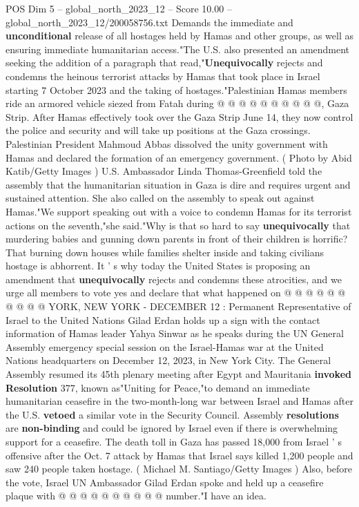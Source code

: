 \begin{textsample}{POS Dim 5 – global\_north\_2023\_12 – Score 10.00 – global\_north\_2023\_12/200058756.txt}
Demands the immediate and \textbf{unconditional} release of all hostages held by Hamas and other groups, as well as ensuring immediate humanitarian access."The U.S. also presented an amendment seeking the addition of a paragraph that read,"\textbf{Unequivocally} rejects and condemns the heinous terrorist attacks by Hamas that took place in Israel starting 7 October 2023 and the taking of hostages."Palestinian Hamas members ride an armored vehicle siezed from Fatah during @ @ @ @ @ @ @ @ @ @, Gaza Strip.
After Hamas effectively took over the Gaza Strip June 14, they now control the police and security and will take up positions at the Gaza crossings.
Palestinian President Mahmoud Abbas dissolved the unity government with Hamas and declared the formation of an emergency government. ( Photo by Abid Katib/Getty Images ) U.S.
Ambassador Linda Thomas-Greenfield told the assembly that the humanitarian situation in Gaza is dire and requires urgent and sustained attention.
She also called on the assembly to speak out against Hamas."We support speaking out with a voice to condemn Hamas for its terrorist actions on the seventh,"she said."Why is that so hard to say \textbf{unequivocally} that murdering babies and gunning down parents in front of their children is horrific?
That burning down houses while families shelter inside and taking civilians hostage is abhorrent.
It ' s why today the United States is proposing an amendment that \textbf{unequivocally} rejects and condemns these atrocities, and we urge all members to vote yes and declare that what happened on @ @ @ @ @ @ @ @ @ @ YORK, NEW YORK - DECEMBER 12 : Permanent Representative of Israel to the United Nations Gilad Erdan holds up a sign with the contact information of Hamas leader Yahya Sinwar as he speaks during the UN General Assembly emergency special session on the Israel-Hamas war at the United Nations headquarters on December 12, 2023, in New York City.
The General Assembly resumed its 45th plenary meeting after Egypt and Mauritania \textbf{invoked} \textbf{Resolution} 377, known as"Uniting for Peace,"to demand an immediate humanitarian ceasefire in the two-month-long war between Israel and Hamas after the U.S. \textbf{vetoed} a similar vote in the Security Council.
Assembly \textbf{resolutions} are \textbf{non-binding} and could be ignored by Israel even if there is overwhelming support for a ceasefire.
The death toll in Gaza has passed 18,000 from Israel ' s offensive after the Oct. 7 attack by Hamas that Israel says killed 1,200 people and saw 240 people taken hostage. ( Michael M.
Santiago/Getty Images ) Also, before the vote, Israel UN Ambassador Gilad Erdan spoke and held up a ceasefire plaque with @ @ @ @ @ @ @ @ @ @ number."I have an idea.

\end{textsample}
